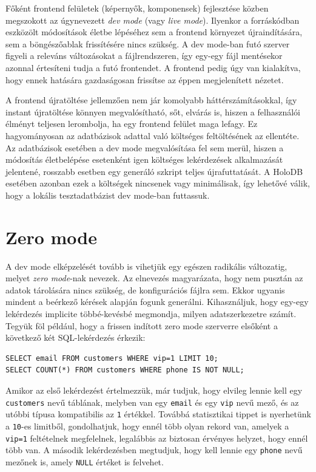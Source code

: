 \documentclass[
    parspace,
    noindent,
    nohyp,
]{elteiktdk}[2023/04/10]
\begin{document}
Főként frontend felületek (képernyők, komponensek) fejlesztése közben megszokott
az úgynevezett \textit{dev mode} (vagy \textit{live mode}).
Ilyenkor a forráskódban eszközölt módosítások életbe lépéséhez
sem a frontend környezet újraindítására, sem a böngészőablak frissítésére nincs szükség.
A dev mode-ban futó szerver figyeli a releváns változásokat a fájlrendszeren,
így egy-egy fájl mentésekor azonnal értesíteni tudja a futó frontendet.
A frontend pedig úgy van kialakítva, hogy ennek hatására gazdaságosan frissítse az éppen megjelenített nézetet.

A frontend újratöltése jellemzően nem jár komolyabb háttérszámításokkal,
így instant újratöltése könnyen megvalósítható,
sőt, elvárás is, hiszen a felhasználói élményt teljesen lerombolja,
ha egy frontend felület maga lefagy.
Ez hagyományosan az adatbázisok adattal való költséges feltöltésének az ellentéte.
Az adatbázisok esetében a dev mode megvalósítása fel sem merül,
hiszen a módosítás életbelépése esetenként igen költséges lekérdezések alkalmazását jelentené,
rosszabb esetben egy generáló szkript teljes újrafuttatását.
A HoloDB esetében azonban ezek a költségek nincsenek vagy minimálisak,
így lehetővé válik, hogy a lokális tesztadatbázist dev mode-ban futtassuk.

\section{Zero mode}

A dev mode elképzelését tovább is vihetjük egy egészen radikális változatig,
melyet \textit{zero mode}-nak nevezek.
Az elnevezés magyarázata, hogy nem pusztán az adatok tárolására nincs szükség,
de konfigurációs fájlra sem.
Ekkor ugyanis mindent a beérkező kérések alapján fogunk generálni.
Kihasználjuk, hogy egy-egy lekérdezés implicite többé-kevésbé megmondja, milyen adatszerkezetre számít.
Tegyük föl például, hogy a frissen indított zero mode szerverre
elsőként a következő két SQL-lekérdezés érkezik:

\vspace{-5pt}
\begin{verbatim}
SELECT email FROM customers WHERE vip=1 LIMIT 10;
SELECT COUNT(*) FROM customers WHERE phone IS NOT NULL;
\end{verbatim}
\vspace{-35pt}

Amikor az első lekérdezést értelmezzük, már tudjuk,
hogy elvileg lennie kell egy \texttt{customers} nevű táblának,
melyben van egy \texttt{email} és egy \texttt{vip} nevű mező,
és az utóbbi típusa kompatibilis az \texttt{1} értékkel.
Továbbá statisztikai tippet is nyerhetünk a \texttt{10}-es limitből,
gondolhatjuk, hogy ennél több olyan rekord van, amelyek a \texttt{vip=1} feltételnek megfelelnek,
legalábbis az biztosan érvényes helyzet, hogy ennél több van.
A második lekérdezésben megtudjuk, hogy kell lennie egy \texttt{phone} nevű mezőnek is,
amely \texttt{NULL} értéket is felvehet.
\end{document}
